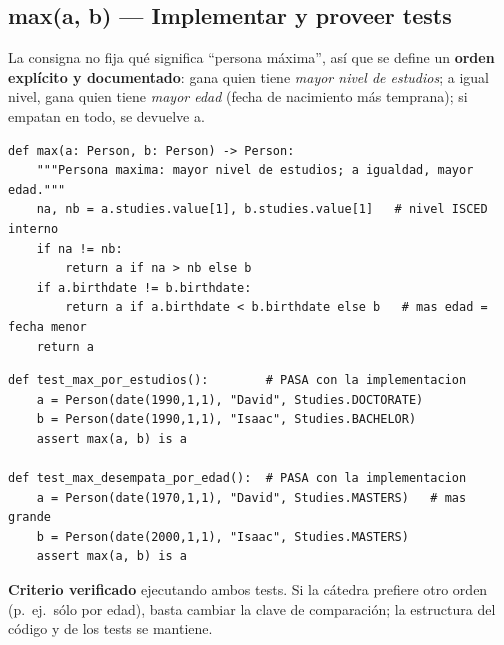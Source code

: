 \documentclass[11pt,a4paper]{article}
\newcommand{\code}[1]{\colorbox{codebg}{\ttfamily\small #1}}
\begin{document}
\subsection{\code{max(a, b)} --- Implementar y proveer tests}
\begin{answer}
La consigna no fija qué significa ``persona máxima'', así que se define un
\textbf{orden explícito y documentado}: gana quien tiene \emph{mayor nivel de estudios}; a igual nivel,
gana quien tiene \emph{mayor edad} (fecha de nacimiento más temprana); si empatan en todo, se devuelve \code{a}.
\end{answer}

\begin{lstlisting}[style=py]
def max(a: Person, b: Person) -> Person:
    """Persona maxima: mayor nivel de estudios; a igualdad, mayor edad."""
    na, nb = a.studies.value[1], b.studies.value[1]   # nivel ISCED interno
    if na != nb:
        return a if na > nb else b
    if a.birthdate != b.birthdate:
        return a if a.birthdate < b.birthdate else b   # mas edad = fecha menor
    return a
\end{lstlisting}

\begin{lstlisting}[style=py]
def test_max_por_estudios():        # PASA con la implementacion
    a = Person(date(1990,1,1), "David", Studies.DOCTORATE)
    b = Person(date(1990,1,1), "Isaac", Studies.BACHELOR)
    assert max(a, b) is a

def test_max_desempata_por_edad():  # PASA con la implementacion
    a = Person(date(1970,1,1), "David", Studies.MASTERS)   # mas grande
    b = Person(date(2000,1,1), "Isaac", Studies.MASTERS)
    assert max(a, b) is a
\end{lstlisting}
\begin{answer}\small
\textbf{Criterio verificado} ejecutando ambos tests. Si la cátedra prefiere otro orden (p.\ ej.\ sólo
por edad), basta cambiar la clave de comparación; la estructura del código y de los tests se mantiene.
\end{answer}

\end{document}
